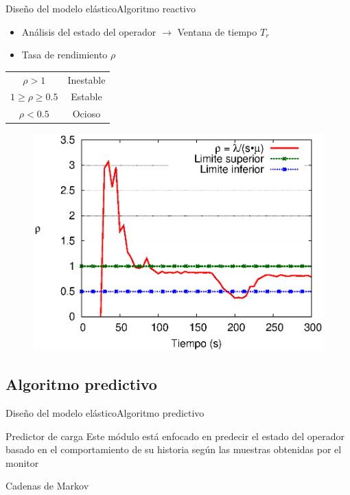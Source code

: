 \begin{frame}{Diseño del modelo elástico}{Algoritmo reactivo}
\begin{itemize}
\item Análisis del estado del operador $\rightarrow$ Ventana de tiempo $T_r$
\item Tasa de rendimiento $\rho$
\end{itemize}
\hspace{1cm}
\begin{tabular}{c c}
	$\rho > 1$ & Inestable \\
	$1 \geqslant \rho \geqslant 0.5$ & Estable \\
	$\rho < 0.5$ & Ocioso
\end{tabular}

\begin{figure}[ht!]
  \centering
    \includegraphics[scale=0.5]{images/Umbrales.eps}
\end{figure}
\end{frame}

\subsection*{Algoritmo predictivo}
\begin{frame}{Diseño del modelo elástico}{Algoritmo predictivo}
\begin{block}{Predictor de carga}
	Este módulo está enfocado en predecir el estado del operador basado en el comportamiento de su historia según las muestras obtenidas por el monitor
\end{block}

\pause
\begin{alertblock}{}
	\centering
	Cadenas de Markov
\end{alertblock}
\end{frame}

